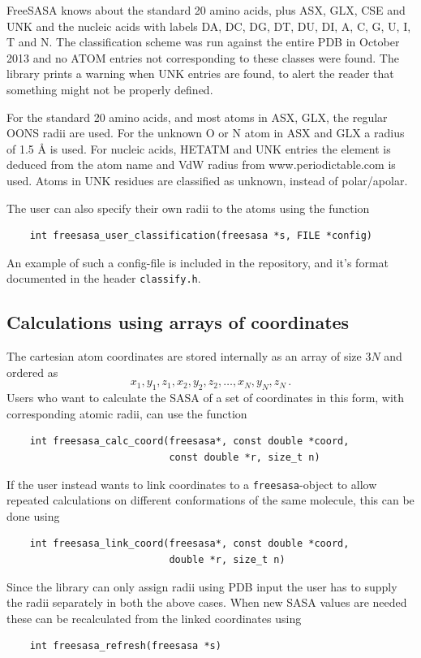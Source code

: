 \documentclass[a4paper,11pt]{article}
\begin{document}
FreeSASA knows about the standard 20 amino acids, plus ASX, GLX, CSE
and UNK and the nucleic acids with labels DA, DC, DG, DT, DU, DI, A,
C, G, U, I, T and N. The classification scheme was run against the
entire PDB in October 2013 and no ATOM entries not corresponding to
these classes were found. The library prints a warning when UNK
entries are found, to alert the reader that something might not be
properly defined.

For the standard 20 amino acids, and most atoms in ASX, GLX, the
regular OONS radii \cite{OONS} are used. For the unknown O or N atom
in ASX and GLX a radius of 1.5 Å is used. For nucleic acids, HETATM and UNK
entries the element is deduced from the atom name and VdW radius from
www.periodictable.com is used. Atoms in UNK residues are classified as
unknown, instead of polar/apolar.

The user can also specify their own radii to the atoms using the function
\begin{verbatim}
    int freesasa_user_classification(freesasa *s, FILE *config)
\end{verbatim}
An example of such a config-file is included in the repository, and
it's format documented in the header \verb|classify.h|.

\subsection{Calculations using arrays of coordinates}

The cartesian atom coordinates are stored internally as an array of
size $3N$ and ordered as $$x_1,y_1,z_1, x_2,y_2,z_2, \ldots
,x_N,y_N,z_N\,.$$ Users who want to calculate the SASA of a set of
coordinates in this form, with corresponding atomic radii, can use the
function
\begin{verbatim}
    int freesasa_calc_coord(freesasa*, const double *coord, 
                            const double *r, size_t n)
\end{verbatim}
If the user instead wants to link coordinates to a
\verb|freesasa|-object to allow repeated calculations on different
conformations of the same molecule, this can be done using
\begin{verbatim}
    int freesasa_link_coord(freesasa*, const double *coord,
                            double *r, size_t n)
\end{verbatim}

Since the library can only assign radii using PDB input the user has
to supply the radii separately in both the above cases. When new SASA
values are needed these can be recalculated from the linked
coordinates using
\begin{verbatim} 
    int freesasa_refresh(freesasa *s)
\end{verbatim}
\end{document}
